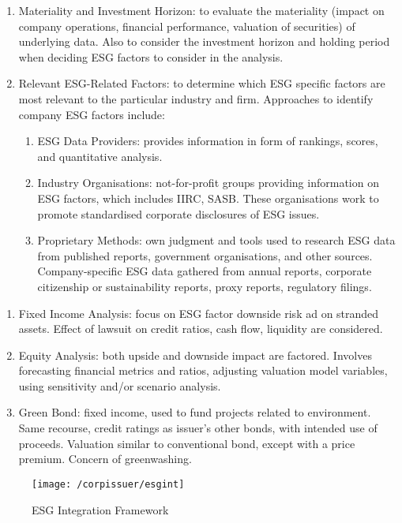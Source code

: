 \begin{remark}  
\begin{enumerate}[label=\roman*.]
\setlength{\itemsep}{0pt}
\item Materiality and Investment Horizon: to evaluate the materiality (impact on company operations, financial performance, valuation of securities) of underlying data. Also to consider the investment horizon and holding period when deciding ESG factors to consider in the analysis.
\item Relevant ESG-Related Factors: to determine which ESG specific factors are most relevant to the particular industry and firm. Approaches to identify company ESG factors include:
\begin{enumerate}[label=\arabic*.]
\setlength{\itemsep}{0pt}
\item ESG Data Providers: provides information in form of rankings, scores, and quantitative analysis.
\item Industry Organisations: not-for-profit groups providing information on ESG factors, which includes IIRC, SASB. These organisations work to promote standardised corporate disclosures of ESG issues.
\item Proprietary Methods: own judgment and tools used to research ESG data from published reports, government organisations, and other sources. Company-specific ESG data gathered from annual reports, corporate citizenship or sustainability reports, proxy reports, regulatory filings.
\end{enumerate}
\end{enumerate}
\end{remark}

\begin{remark} 
\begin{enumerate}[label=\roman*.]
\setlength{\itemsep}{0pt}
\item Fixed Income Analysis: focus on ESG factor downside risk ad on stranded assets. Effect of lawsuit on credit ratios, cash flow, liquidity are considered.
\item Equity Analysis: both upside and downside impact are factored. Involves forecasting financial metrics and ratios, adjusting valuation model variables, using sensitivity and/or scenario analysis.
\item Green Bond: fixed income, used to fund projects related to environment. Same recourse, credit ratings as issuer's other bonds, with intended use of proceeds. Valuation similar to conventional bond, except with a price premium. Concern of greenwashing.
\end{enumerate}
\end{remark}

\begin{figure}[H]
\centering
\texttt{[image: /corpissuer/esgint]}
\caption{ESG Integration Framework}
\end{figure}
